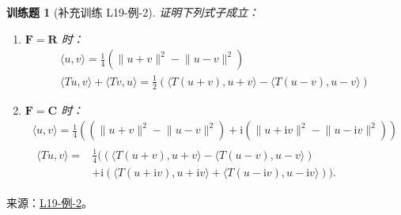\documentclass[12pt,fontset=fandol]{ctexart}
\newtheorem{exercise}{训练题}[section]
\begin{document}
\begin{exercise}[补充训练 L19-例-2]\label{prob:L19-例-2}
证明下列式子成立：
    \begin{enumerate}
        \item $\mathbf{F} = \mathbf{R}$ 时：
              \begin{gather}
                  \label{eq:23:内积和范数的性质1}
                  \langle u, v\rangle = \frac{1}{4}\left( \lVert u + v \rVert^2 - \lVert u - v \rVert^2\right) \\
                  \label{eq:23:内积和范数的性质2}
                  \langle Tu, v\rangle + \langle Tv, u\rangle = \frac{1}{2}\left(\langle T(u + v), u + v\rangle - \langle T(u - v), u - v\rangle\right)
              \end{gather}

        \item $\mathbf{F} = \mathbf{C}$ 时：
              \begin{gather}
                  \label{eq:23:内积和范数的性质3}
                  \langle u, v\rangle = \frac{1}{4}\left((\lVert u + v \rVert^2 - \lVert u - v \rVert^2) + \mathrm{i}(\lVert u + \mathrm{i} v \rVert^2 - \lVert u - \mathrm{i} v \rVert^2)\right) \\
                  \label{eq:23:内积和范数的性质4}
                  \begin{aligned}
                      \langle Tu, v\rangle ={} & \frac{1}{4}  ((\langle T(u + v), u + v\rangle - \langle T(u - v), u - v\rangle)     \\
                                               & + \mathrm{i}(\langle T(u + \mathrm{i} v), u + \mathrm{i} v\rangle + \langle T(u - \mathrm{i} v), u - \mathrm{i} v\rangle)).
                  \end{aligned}
              \end{gather}
    \end{enumerate}
\end{exercise}
\noindent 来源：\href{https://github.com/yhwu-is/Linear-Algebra-Left-Undone/blob/new/%E8%AE%B2%E4%B9%89/%E4%B8%93%E9%A2%98/19%20%E5%86%85%E7%A7%AF%E7%A9%BA%E9%97%B4.tex}{L19-例-2}。
\end{document}
